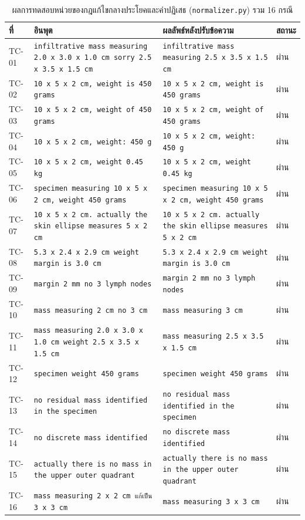 \begin{table}[H]
\centering
\caption{ผลการทดสอบหน่วยของกฎแก้ไขกลางประโยคและคำปฏิเสธ (\texttt{normalizer.py}) รวม 16 กรณี}
\label{tab:unit}
\footnotesize\setlength{\tabcolsep}{3pt}
\begin{tabular}{|p{1.1cm}|p{5.6cm}|p{5.6cm}|p{1.4cm}|}
\hline
\textbf{ที่} & \textbf{อินพุต} & \textbf{ผลลัพธ์หลังปรับข้อความ} & \textbf{สถานะ} \\
\hline
TC-01 & \texttt{infiltrative mass measuring 2.0 x 3.0 x 1.0 cm sorry 2.5 x 3.5 x 1.5 cm} & \texttt{infiltrative mass measuring 2.5 x 3.5 x 1.5 cm} & ผ่าน \\
\hline
TC-02 & \texttt{10 x 5 x 2 cm, weight is 450 grams} & \texttt{10 x 5 x 2 cm, weight is 450 grams} & ผ่าน \\
\hline
TC-03 & \texttt{10 x 5 x 2 cm, weight of 450 grams} & \texttt{10 x 5 x 2 cm, weight of 450 grams} & ผ่าน \\
\hline
TC-04 & \texttt{10 x 5 x 2 cm, weight: 450 g} & \texttt{10 x 5 x 2 cm, weight: 450 g} & ผ่าน \\
\hline
TC-05 & \texttt{10 x 5 x 2 cm, weight 0.45 kg} & \texttt{10 x 5 x 2 cm, weight 0.45 kg} & ผ่าน \\
\hline
TC-06 & \texttt{specimen measuring 10 x 5 x 2 cm, weight 450 grams} & \texttt{specimen measuring 10 x 5 x 2 cm, weight 450 grams} & ผ่าน \\
\hline
TC-07 & \texttt{10 x 5 x 2 cm. actually the skin ellipse measures 5 x 2 cm} & \texttt{10 x 5 x 2 cm. actually the skin ellipse measures 5 x 2 cm} & ผ่าน \\
\hline
TC-08 & \texttt{5.3 x 2.4 x 2.9 cm weight margin is 3.0 cm} & \texttt{5.3 x 2.4 x 2.9 cm weight margin is 3.0 cm} & ผ่าน \\
\hline
TC-09 & \texttt{margin 2 mm no 3 lymph nodes} & \texttt{margin 2 mm no 3 lymph nodes} & ผ่าน \\
\hline
TC-10 & \texttt{mass measuring 2 cm no 3 cm} & \texttt{mass measuring 3 cm} & ผ่าน \\
\hline
TC-11 & \texttt{mass measuring 2.0 x 3.0 x 1.0 cm weight 2.5 x 3.5 x 1.5 cm} & \texttt{mass measuring 2.5 x 3.5 x 1.5 cm} & ผ่าน \\
\hline
TC-12 & \texttt{specimen weight 450 grams} & \texttt{specimen weight 450 grams} & ผ่าน \\
\hline
TC-13 & \texttt{no residual mass identified in the specimen} & \texttt{no residual mass identified in the specimen} & ผ่าน \\
\hline
TC-14 & \texttt{no discrete mass identified} & \texttt{no discrete mass identified} & ผ่าน \\
\hline
TC-15 & \texttt{actually there is no mass in the upper outer quadrant} & \texttt{actually there is no mass in the upper outer quadrant} & ผ่าน \\
\hline
TC-16 & \texttt{mass measuring 2 x 2 cm แก้เป็น 3 x 3 cm} & \texttt{mass measuring 3 x 3 cm} & ผ่าน \\
\hline
\end{tabular}
\end{table}
